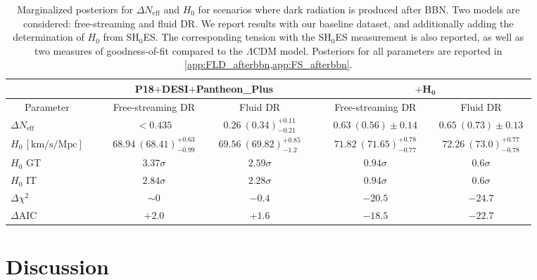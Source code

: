 \documentclass[aps,prd,twocolumn,notitlepage,
superscriptaddress,
nofootinbib,floatfix]{revtex4-2}
\newcommand{\planck}{\textbf{P18}}
\newcommand{\desi}{$\mathbf{+}$\textbf{DESI}}
\newcommand{\pantheon}{$\mathbf{+}${\bf Pantheon\_Plus}}
\newcommand{\shoes}{$\mathbf{+ H_0}$}
\begin{document}
\begin{table}

\begin{tabular} {| l |l| c| c|l| c| c|}
\hline\hline
 \multicolumn{1}{|c|}{}& &  \multicolumn{2}{|c|}{~~\planck\desi\pantheon~~} &&  \multicolumn{2}{|c|}{\shoes}\\
 \hline
 \multicolumn{1}{|c|}{ Parameter} & & \multicolumn{1}{|c|}{~~Free-streaming DR~~} &  \multicolumn{1}{|c|}{~~~~~Fluid DR~~~~~} & &  \multicolumn{1}{|c|}{~~Free-streaming DR~~} &  \multicolumn{1}{|c|}{~~~~~Fluid DR~~~~~}\\
\hline\hline
$\Delta N_{\mbox{eff}}$    && $ < 0.435$ & $0.26~(0.34)^{+0.11}_{-0.21}      $ & & $0.63~(0.56)\pm 0.14      $ & $0.65~(0.73)\pm 0.13      $\\
$H_0 \,[\mathrm{km}/\mathrm{s}/\mathrm{Mpc}]$ & &$68.94~(68.41)^{+0.63}_{-0.99}     $ & $69.56~(69.82)^{+0.85}_{-1.2}      $ & &$71.82~(71.65)^{+0.78}_{-0.77}     $ & $72.26~(73.0)^{+0.77}_{-0.78}     $\\
\hline
\hline
$H_0$ GT && $3.37\sigma $ & $2.59\sigma $ && $0.94\sigma $ & $0.6\sigma $\\
\hline
$H_0$ IT && $2.84\sigma $ & $2.28\sigma $ & &$0.94\sigma $ & $0.6\sigma $\\
\hline
$\Delta \chi^2$ & &$\sim 0$ & $-0.4$ && $-20.5$ & $-24.7$\\
\hline
$\Delta$AIC && $+2.0$ & $+1.6$ && $-18.5$ & $-22.7$\\
\hline
\end{tabular}

\caption{Marginalized posteriors for $\Delta N_\text{eff}$ and $H_0$ for scenarios where dark radiation is produced after BBN. Two models are considered: free-streaming and fluid DR. We report results with our baseline dataset, and additionally adding the determination of $H_0$ from SH$_0$ES. The corresponding tension with the SH$_0$ES measurement is also reported, as well as two measures of goodness-of-fit compared to the $\Lambda$CDM model. Posteriors for all parameters are reported in \cref{app:FLD_afterbbn,app:FS_afterbbn}.}
\label{tab:plusshoes}

\end{table}




\section{Discussion}\label{sec:discussions}
\end{document}
